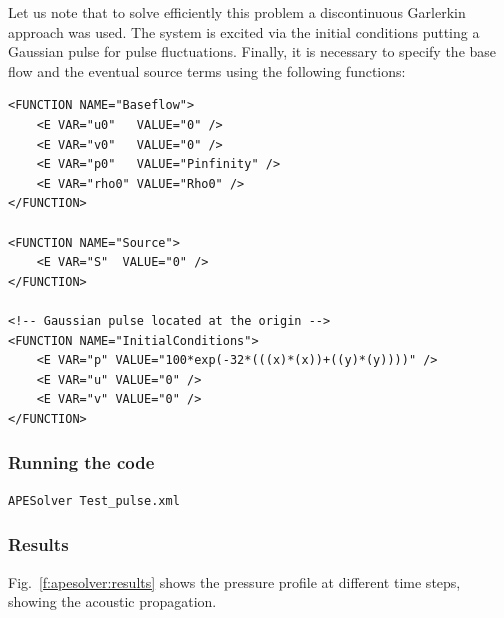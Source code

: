 Let us note that to solve efficiently this problem a discontinuous Garlerkin
approach was used. The
system is excited via the initial conditions putting a Gaussian pulse for pulse
fluctuations.  Finally, it is necessary to specify the base flow and the
eventual source terms using the following functions:

\begin{lstlisting}[style=XmlStyle]
<FUNCTION NAME="Baseflow"> 
    <E VAR="u0"   VALUE="0" />
    <E VAR="v0"   VALUE="0" />
    <E VAR="p0"   VALUE="Pinfinity" />
    <E VAR="rho0" VALUE="Rho0" />
</FUNCTION>

<FUNCTION NAME="Source"> 
    <E VAR="S"  VALUE="0" />
</FUNCTION>

<!-- Gaussian pulse located at the origin -->
<FUNCTION NAME="InitialConditions">
    <E VAR="p" VALUE="100*exp(-32*(((x)*(x))+((y)*(y))))" />
    <E VAR="u" VALUE="0" />
    <E VAR="v" VALUE="0" />
</FUNCTION>
\end{lstlisting}

\subsubsection{Running the code}
\begin{lstlisting}[style=BashInputStyle]
APESolver Test_pulse.xml
\end{lstlisting}

\subsubsection{Results}
Fig.~\ref{f:apesolver:results} shows the pressure profile at different
time steps, showing the acoustic propagation.


